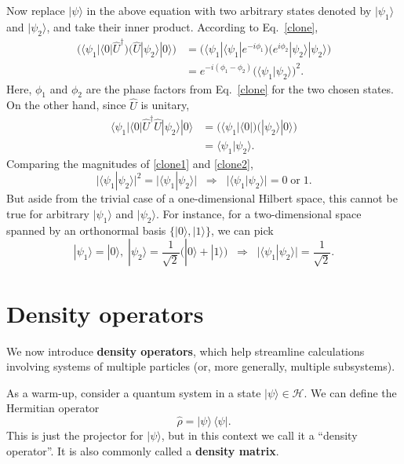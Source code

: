 \documentclass[prx,12pt]{revtex4-2}
\begin{document}
Now replace $|\psi\rangle$ in the above equation with two arbitrary
states denoted by $|\psi_1\rangle$ and $|\psi_2\rangle$, and take
their inner product.  According to Eq.~\eqref{clone},
\begin{align}
  \Big(\langle \psi_1 | \langle 0 | \hat{U}^\dagger \Big)
  \Big(\hat{U} | \psi_2 \rangle |0\rangle \Big)
  &=  \Big(\langle \psi_1| \langle \psi_1| e^{-i\phi_1} \Big) \Big( e^{i\phi_2} |\psi_2\rangle|\psi_2\rangle\Big) \\
  &= e^{-i(\phi_1-\phi_2)} \Big( \langle\psi_1 | \psi_2\rangle \Big)^2. \label{clone1}
\end{align}
Here, $\phi_1$ and $\phi_2$ are the phase factors from
Eq.~\eqref{clone} for the two chosen states.  On the other hand, since
$\hat{U}$ is unitary,
\begin{align}
  \langle \psi_1 | \langle 0 | \hat{U}^\dagger \hat{U} | \psi_2 \rangle |0\rangle
  &= \Big(\langle \psi_1 | \langle 0| \Big) \Big(| \psi_2 \rangle |0\rangle\Big)
  \\ &= \langle\psi_1 | \psi_2\rangle. \label{clone2}
\end{align}
Comparing the magnitudes of \eqref{clone1} and \eqref{clone2},
\begin{equation}
  \big|\langle \psi_1 | \psi_2\rangle \big|^2
  = \big| \langle\psi_1 | \psi_2\rangle \big|
  \;\;\Rightarrow \;\;
  \big|\langle\psi_1 | \psi_2\rangle\big| = 0 \;\mathrm{or}\; 1.
\end{equation}
But aside from the trivial case of a one-dimensional Hilbert space,
this cannot be true for arbitrary $|\psi_1\rangle$ and
$|\psi_2\rangle$.  For instance, for a two-dimensional space spanned
by an orthonormal basis $\{|0\rangle, |1\rangle\}$, we can pick
\begin{equation}
  |\psi_1\rangle = |0\rangle, \;
  |\psi_2\rangle = \frac{1}{\sqrt{2}}\big(|0\rangle +
  |1\rangle\big)
  \;\;\Rightarrow\;\;
  \big|\langle\psi_1|\psi_2\rangle\big| = \frac{1}{\sqrt{2}}.
\end{equation}

\section{Density operators}

We now introduce \textbf{density operators}, which help streamline
calculations involving systems of multiple particles (or, more
generally, multiple subsystems).

As a warm-up, consider a quantum system in a state $|\psi\rangle \in
\mathscr{H}$.  We can define the Hermitian operator
\begin{equation}
  \hat{\rho} = |\psi\rangle\, \langle\psi|.
  \label{rho_pure}
\end{equation}
This is just the projector for $|\psi\rangle$, but in this context we
call it a ``density operator''.  It is also commonly called a
\textbf{density matrix}.
\end{document}
